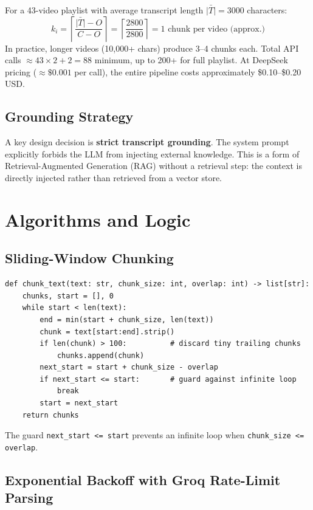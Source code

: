 \documentclass[11pt,a4paper]{article}
\begin{document}
For a 43-video playlist with average transcript length $\bar{|T|} = 3000$ characters:
\[
k_i = \left\lceil \frac{\bar{|T|} - O}{C - O} \right\rceil = \left\lceil \frac{2800}{2800} \right\rceil = 1 \text{ chunk per video (approx.)}
\]
In practice, longer videos (10,000+ chars) produce 3--4 chunks each. Total API calls $\approx 43 \times 2 + 2 = 88$ minimum, up to 200+ for full playlist. At DeepSeek pricing ($\approx\$0.001$ per call), the entire pipeline costs approximately \$0.10--\$0.20 USD.

\subsection{Grounding Strategy}

A key design decision is \textbf{strict transcript grounding}. The system prompt explicitly forbids the LLM from injecting external knowledge. This is a form of Retrieval-Augmented Generation (RAG) without a retrieval step: the context is directly injected rather than retrieved from a vector store.

\section{Algorithms and Logic}

\subsection{Sliding-Window Chunking}

\begin{lstlisting}[caption={Sliding-window text chunker with overlap}]
def chunk_text(text: str, chunk_size: int, overlap: int) -> list[str]:
    chunks, start = [], 0
    while start < len(text):
        end = min(start + chunk_size, len(text))
        chunk = text[start:end].strip()
        if len(chunk) > 100:          # discard tiny trailing chunks
            chunks.append(chunk)
        next_start = start + chunk_size - overlap
        if next_start <= start:       # guard against infinite loop
            break
        start = next_start
    return chunks
\end{lstlisting}

The guard \texttt{next\_start <= start} prevents an infinite loop when \texttt{chunk\_size <= overlap}.

\subsection{Exponential Backoff with Groq Rate-Limit Parsing}
\end{document}
